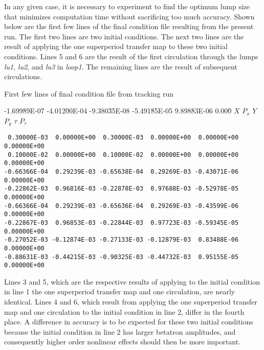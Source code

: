      In any given case, it is necessary to experiment to find the optimum
lump size that minimizes computation time without sacrificing too much
accuracy. Shown below are the first few lines of the final condition file
resulting from the present \Mary run.  The first two lines are two
initial conditions.  The next two lines are the result of applying the one
superperiod transfer map to these two initial conditions.  Lines 5 and 6
are the result of the first circulation through the lumps {\em lu1}, {\em lu2},
and {\em lu3} in {\em loop1}.  The remaining lines are the result of subsequent circulations.
\vspace{5mm}

         First few lines of final condition file from tracking run
\begin{footnotesize}
\begin{tt}
\begin{tabbing}
-1.699\=89E-07 -4.012\=00E-04 -9.380\=35E-08 -5.491\=85E-05 9.898\=83E-06 0.000\= \kill
\>$X$ \>$P_x$ \>$Y$ \>$P_y$ \>$\tau$ \>$P_{\tau}$
\end{tabbing}
\end{tt}
\vspace{-5mm}
\begin{verbatim}
 0.30000E-03  0.00000E+00  0.30000E-03  0.00000E+00  0.00000E+00 0.00000E+00
 0.10000E-02  0.00000E+00  0.10000E-02  0.00000E+00  0.00000E+00 0.00000E+00
-0.66366E-04  0.29239E-03 -0.65638E-04  0.29269E-03 -0.43071E-06 0.00000E+00
-0.22862E-03  0.96816E-03 -0.22878E-03  0.97688E-03 -0.52978E-05 0.00000E+00
-0.66366E-04  0.29239E-03 -0.65636E-04  0.29269E-03 -0.43599E-06 0.00000E+00
-0.22867E-03  0.96853E-03 -0.22844E-03  0.97723E-03 -0.59345E-05 0.00000E+00
-0.27052E-03 -0.12874E-03 -0.27133E-03 -0.12879E-03  0.83488E-06 0.00000E+00
-0.88631E-03 -0.44215E-03 -0.90325E-03 -0.44732E-03  0.95155E-05 0.00000E+00
\end{verbatim}
\end{footnotesize}

     Lines 3 and 5, which are the respective results of applying to the
initial condition in line 1 the one superperiod transfer map and one
circulation, are nearly identical.  Lines 4 and 6, which result from
applying the one superperiod transfer map and one circulation to the
initial condition in line 2, differ in the fourth place.  A difference in
accuracy is to be expected for these two initial conditions because the
initial condition in line 2 has larger betatron amplitudes, and
consequently higher order nonlinear effects should then be more important.

